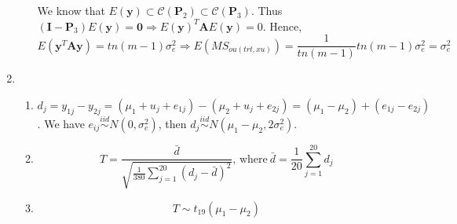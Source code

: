 \documentclass{article}
\begin{document}
\begin{enumerate}[leftmargin = 0 em, label = \arabic*., font = \bfseries]
\begin{enumerate}
	      	 We know that $E(\bm y) \subset \mathcal{C}(\bm P_{2}) \subset \mathcal{C}(\bm P_{3})$. Thus $(\bm I - \bm P_{3}) E(\bm y) = \bm 0 \Rightarrow E(\bm y)^T \bm A E(\bm y) = 0$.
	      	 Hence,
	      	 \[E (\bm y^T \bm A \bm y) = tn(m-1) \sigma_e^2 \Rightarrow E(MS_{ou(trt, xu)}) = \frac{1}{tn(m-1)} tn (m-1) \sigma_e^2 = \sigma_e^2\]
	      	 


			  \end{enumerate}

			  \item 
			  \begin{enumerate}
			  	\item 
			  	$d_j = y_{1j} - y_{2j} = (\mu_1 + u _j + e_{1j}) - (\mu_2 + u_j + e_{2j}) = (\mu_1 - \mu_2) + (e_{1j} - e_{2j})$. We have $e_{ij} \overset{iid}{\sim} N(0, \sigma_{e}^2)$, then $d_j \overset{iid}{\sim} N(\mu_1 - \mu_2 , 2 \sigma_{e}^2)$.

			  	 \item 
			  	 \[T = \frac{\bar{d}}{\sqrt{\frac{1}{380} \sum_{j = 1}^{20} (d_j - \bar{d})^2}},\, \mathrm{where \ } \bar{d} = \frac{1}{20} \sum_{j = 1}^{20} d_j \] 


			  	 \item 
			  	 \[T \sim t_{19}(\mu_1 - \mu_2)\]
			  \end{enumerate}
			  
			   
	      \end{enumerate}
	      
\end{document}
